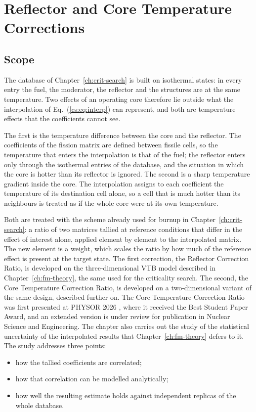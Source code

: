 
\chapter{Reflector and Core Temperature Corrections}\label{ch:correction-ratios}

\section{Scope}

The database of Chapter~\ref{ch:crit-search} is built on isothermal states: in
every entry the fuel, the moderator, the reflector and the structures are at
the same temperature. Two effects of an operating core therefore lie outside
what the interpolation of Eq.~(\ref{cs:eq:interp}) can represent, and both are
temperature effects that the coefficients cannot see.

The first is the temperature difference between the core and the reflector.
The coefficients of the fission matrix are defined between fissile cells, so
the temperature that enters the interpolation is that of the fuel; the
reflector enters only through the isothermal entries of the database, and the
situation in which the core is hotter than its reflector is ignored. The second is a sharp
temperature gradient inside the core. The interpolation assigns to each
coefficient the temperature of its destination cell alone, so a cell that is
much hotter than its neighbours is treated as if the whole core were at its
own temperature.

Both are treated with the scheme already used for burnup in
Chapter~\ref{ch:crit-search}: a ratio of two matrices tallied at reference
conditions that differ in the effect of interest alone, applied element by
element to the interpolated matrix. The new element is a weight, which
scales the ratio by how much of the reference effect is present at the
target state. The first correction, the Reflector Correction Ratio, is developed on
the three-dimensional VTB model described in Chapter~\ref{ch:fm-theory}, the
same used for the criticality search. The second, the Core Temperature Correction Ratio, is
developed on a two-dimensional variant of the same design, described further
on. The Core Temperature Correction Ratio was first presented at PHYSOR 2026
\cite{VitaPHYSOR2026}, where it received the Best Student Paper Award, and an
extended version is under review for publication in Nuclear Science and
Engineering. The chapter also carries out the study of the statistical
uncertainty of the interpolated results that Chapter~\ref{ch:fm-theory} defers
to it. The study addresses three points:
\begin{itemize}
  \item how the tallied coefficients are correlated;
  \item how that correlation can be modelled analytically;
  \item how well the resulting estimate holds against independent replicas
  of the whole database.
\end{itemize}

